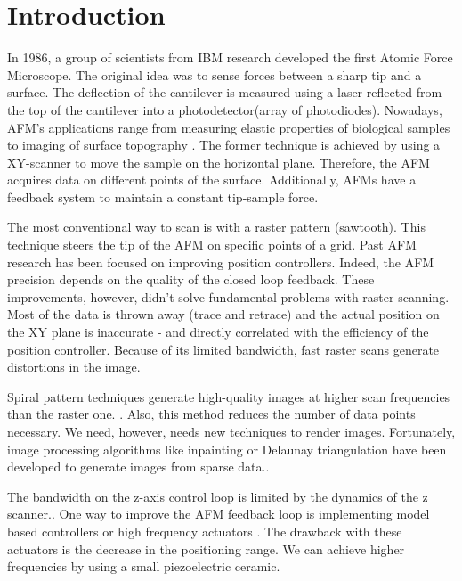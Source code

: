 \chapter{Introduction}

In 1986, a group of scientists from IBM research developed the first Atomic Force Microscope.\cite{binnig1986atomic} The original idea was to sense forces between a sharp tip and a surface. The deflection of the cantilever is measured using a laser reflected from the top of the cantilever into a photodetector(array of photodiodes). Nowadays, AFM's applications range from measuring elastic properties of biological samples to imaging of surface topography\cite{radmacher1997measuring} \cite{hansma1988scanning}. The former technique is achieved by using a XY-scanner to move the sample on the horizontal plane. Therefore, the AFM acquires data on different points of the surface. Additionally, AFMs have a feedback system to maintain a constant tip-sample force. 

The most conventional way to scan is with a raster pattern (sawtooth). This technique steers the tip of the AFM on specific points of a grid. Past AFM research has been focused on improving position controllers. Indeed, the AFM precision depends on the quality of the closed loop feedback. These improvements, however, didn't solve fundamental problems with raster scanning. Most of the data is thrown away (trace and retrace) and the actual position on the XY plane is inaccurate - and directly correlated with the efficiency of the position controller. Because of its limited bandwidth, fast raster scans generate distortions in the image.\cite{yong2010high}

Spiral pattern techniques generate high-quality images at higher scan frequencies than the raster one. \cite{mahmood2009fast}. Also, this method reduces the number of data points necessary. \cite{nonrasterdata}We need, however, needs new techniques to render images. Fortunately, image processing algorithms like inpainting \cite{richard2001fast} or Delaunay triangulation have been developed to generate images from sparse data.\cite{nonrasterdata}.

The bandwidth on the z-axis control loop is limited by the dynamics of the z scanner.\cite{jeong:093706}. One way to improve the AFM feedback loop is implementing model based controllers or high frequency actuators \cite{sulchek1999dual}. The drawback with these actuators is the decrease in the positioning range. We can achieve higher frequencies by using a small piezoelectric ceramic.\cite{sulchek1999dual}

